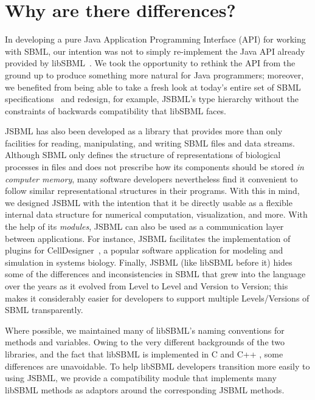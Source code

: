
\section{Why are there differences?}
\label{sec:jsbml-design-goals}

In developing a pure Java Application Programming Interface (API) for
working with SBML, our intention was not to simply re-implement the Java API
already provided by libSBML~\citep{Bornstein2008}.
We took the opportunity to rethink the API
 from the ground up to
produce something more natural for Java programmers; moreover, we
benefited from being able to take a fresh look at today's entire set of
SBML specifications~\citep{Hucka2003, Hucka2008, Hucka2010a}
 and redesign, for example, JSBML's type
hierarchy without the constraints of backwards compatibility that libSBML
faces. 

JSBML has also been developed as a library that provides more than only
facilities for reading, manipulating, and writing SBML files and data
streams. Although SBML only defines the structure of representations of
biological processes in files and does not prescribe how its components
should be stored \emph{in computer memory}, many software developers
nevertheless find it convenient to follow similar representational
structures in their programs.  With this
in mind, we designed JSBML with the intention that it be directly usable as
a flexible internal data structure for numerical computation,
visualization, and more. With the help of its \emph{modules}, JSBML can
also be used as a communication layer between applications. For instance,
JSBML facilitates the implementation of plugins for
CellDesigner~\citep{Funahashi2003},  a popular software
application for modeling and simulation in systems biology. Finally, JSBML
(like libSBML before it) hides some of the differences and inconsistencies
in SBML  that grew into the language
over the years as it evolved from Level to Level and Version to Version;
this makes it considerably easier for developers to support multiple
Levels/Versions of SBML transparently.

Where possible, we maintained many of libSBML's naming conventions for
methods and variables. Owing to the very different backgrounds of the two
libraries, and the fact that libSBML is implemented in C  and
C++ , some differences are unavoidable. To help libSBML
developers transition more easily to using JSBML, we provide a
compatibility module that implements many libSBML methods as adaptors
around the corresponding JSBML methods.

